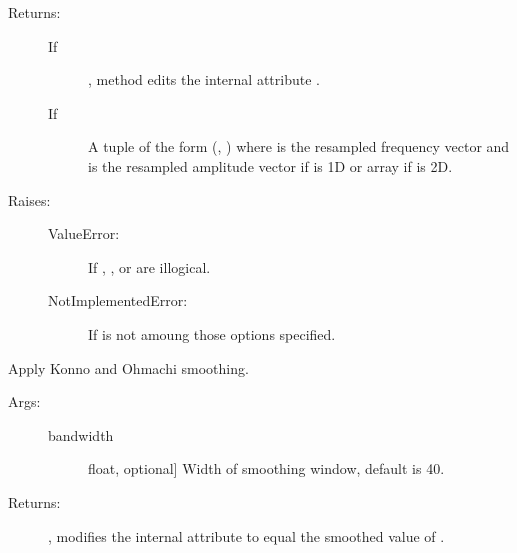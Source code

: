 \documentclass[letterpaper,10pt,english,openany,oneside]{sphinxmanual}
\begin{document}
\begin{fulllineitems}
\begin{fulllineitems}
\begin{description}
\begin{description}
\end{description}

\item[{Returns:}] \leavevmode\begin{description}
\item[{If }] \leavevmode
{}, method edits the internal attribute .

\item[{If }] \leavevmode
A tuple of the form (, )
where  is the resampled frequency vector and 
 is the resampled amplitude vector if 
 is 1D or array if  is 2D.

\end{description}

\item[{Raises:}] \leavevmode\begin{description}
\item[{ValueError:}] \leavevmode
If , , or  are illogical.

\item[{NotImplementedError:}] \leavevmode
If  is not amoung those options specified.

\end{description}

\end{description}

\end{fulllineitems}


\begin{fulllineitems}
\label{\detokenize{index:sigpropy.FourierTransform.smooth_konno_ohmachi}}
Apply Konno and Ohmachi smoothing.
\begin{description}
\item[{Args:}] \leavevmode\begin{description}
\item[{bandwidth}] \leavevmode{[}float, optional{]}
Width of smoothing window, default is 40.

\end{description}

\item[{Returns:}] \leavevmode
{}, modifies the internal attribute  to equal the
smoothed value of .

\end{description}

\end{fulllineitems}


\end{fulllineitems}




\renewcommand{\indexname}{Index}
\printindex
\end{document}
